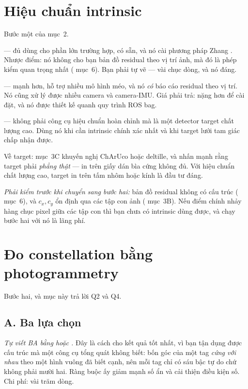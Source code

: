 \documentclass[../../marker.tex]{subfiles}
\begin{document}
\section{Hiệu chuẩn intrinsic}

Bước một của  mục~2.

\emph{ } --- đủ dùng cho phần lớn trường hợp, có sẵn, và nó cài phương pháp Zhang \cite{zhang2000flexible}. Nhược điểm: nó không cho bạn bản đồ residual theo vị trí ảnh, mà đó là phép kiểm quan trọng nhất ( mục~6). Bạn phải tự vẽ --- vài chục dòng, và nó đáng.

\emph{ \cite{furgale2013unified}} --- mạnh hơn, hỗ trợ nhiều mô hình méo, và nó \emph{có} báo cáo residual theo vị trí. Nó cũng xử lý được nhiều camera và camera-IMU. Giá phải trả: nặng hơn để cài đặt, và nó được thiết kế quanh quy trình ROS bag.

\emph{ \cite{chen2018deltille}} --- không phải công cụ hiệu chuẩn hoàn chỉnh mà là một detector target chất lượng cao. Dùng nó khi cần intrinsic chính xác nhất và khi target lưới tam giác chấp nhận được.

Về target:  mục~3C khuyến nghị ChArUco hoặc deltille, và nhấn mạnh rằng target phải \emph{phẳng thật} --- in trên giấy dán bìa cứng không đủ. Với hiệu chuẩn chất lượng cao, target in trên tấm nhôm hoặc kính là đầu tư đáng.

\emph{Phải kiểm trước khi chuyển sang bước hai:} bản đồ residual không có cấu trúc ( mục~6), và \(c_x, c_y\) ổn định qua các tập con ảnh ( mục~3B). Nếu điểm chính nhảy hàng chục pixel giữa các tập con thì bạn chưa có intrinsic dùng được, và chạy bước hai với nó là lãng phí.

\section{Đo constellation bằng photogrammetry}

Bước hai, và mục này trả lời Q2 và Q4.

\subsection{A. Ba lựa chọn}

\emph{Tự viết BA bằng  \cite{agarwal2012ceres} hoặc  \cite{dellaert2017factor}.} Đây là cách cho kết quả tốt nhất, vì bạn tận dụng được cấu trúc mà một công cụ tổng quát không biết: bốn góc của một tag \emph{cứng với nhau} theo một hình vuông đã biết cạnh, nên mỗi tag chỉ có sáu bậc tự do chứ không phải mười hai. Ràng buộc ấy giảm mạnh số ẩn và cải thiện điều kiện số. Chi phí: vài trăm dòng.
\end{document}
